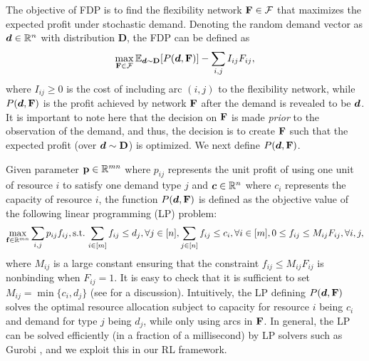 \documentclass{article} %
\begin{document}
The objective of FDP is to find the flexibility network $\mathbf{F} \in \mathcal{F}$ that maximizes the expected profit under stochastic demand. Denoting the random demand vector as $\boldsymbol{d} \in \mathbb{R}^n$ with distribution $\mathbf{D}$, the FDP can be defined as
\begin{equation}\label{eq:fdp}
    \max_{\mathbf{F} \in \mathcal{F}} \mathbb{E}_{\boldsymbol{d} \sim \mathbf{D}}[P(\boldsymbol{d}, \mathbf{F})] - \sum_{i,j} I_{ij}F_{ij},
\end{equation}
where $I_{ij} \geq 0$ is the cost of including arc $(i,j)$ to the flexibility network, while $P(\boldsymbol{d}, \mathbf{F})$ is the profit achieved by network $\mathbf{F}$ after the demand is revealed to be $\boldsymbol{d}$. It is important to note here that the decision on $\mathbf{F}$ is made \emph{prior} to the observation of the demand, and thus, the decision is to create $\mathbf{F}$ such that the expected profit (over $\boldsymbol{d} \sim \mathbf{D}$) is optimized. We next define $P(\boldsymbol{d}, \mathbf{F})$.




Given parameter $\mathbf{p} \in \mathbb{R}^{mn}$ where $p_{ij}$ represents the unit profit of using one unit of resource $i$ to satisfy one demand type $j$ and $\boldsymbol{c} \in \mathbb{R}^n$ where $c_i$ represents the capacity of resource $i$, the function $P(\boldsymbol{d}, \mathbf{F})$ is defined as the objective value of the following linear programming (LP) problem:
\begin{equation*} \max_{\mathbf{f} \in \mathbb{R}^{m n}} \sum_{i,j}p_{ij}f_{ij},
 \mbox{s.t.} \, \sum_{i \in [m]}f_{ij} \leq d_j, \forall j \in [n], \sum_{j \in [n]}f_{ij} \leq c_i, \forall i \in [m],  0 \leq f_{ij} \leq M_{ij}F_{ij} , \forall i,j, 
\end{equation*}
where $M_{ij}$ is a large constant ensuring that the constraint $f_{ij} \leq M_{ij}F_{ij}$ is nonbinding when $F_{ij} = 1$. It is easy to check that it is sufficient to set $M_{ij} = \min\{c_i, d_j\}$ (see \citet{feng2017process} for a discussion). Intuitively, the LP defining $P(\boldsymbol{d}, \mathbf{F})$ solves the optimal resource allocation subject to capacity for resource $i$ being $c_i$ and demand for type $j$ being $d_j$, while only using arcs in $\mathbf{F}$. In general, the LP can be solved efficiently (in a fraction of a millisecond) by LP solvers such as Gurobi \citep{gurobi}, and we exploit this in our RL framework.

\end{document}
